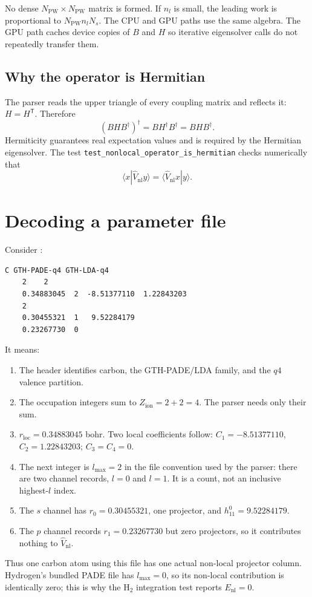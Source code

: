 \documentclass[10pt,twocolumn]{article}
\newcommand{\vnl}{\widehat V_{\mathrm{nl}}}
\newcommand{\zion}{Z_{\mathrm{ion}}}
\newcommand{\code}[1]{\texttt{#1}}
\begin{document}
No dense \(N_{\mathrm{PW}}\times N_{\mathrm{PW}}\) matrix is formed.  If
\(n_l\) is small, the leading work is proportional to
\(N_{\mathrm{PW}}n_lN_s\).  The CPU and GPU paths use the same algebra.  The
GPU path caches device copies of \(B\) and \(H\) so iterative eigensolver
calls do not repeatedly transfer them.

\subsection{Why the operator is Hermitian}

The parser reads the upper triangle of every coupling matrix and reflects it:
\(H=H^\mathsf T\).  Therefore
\begin{equation}
(BHB^\dagger)^\dagger
=BH^\dagger B^\dagger=BHB^\dagger.
\end{equation}
Hermiticity guarantees real expectation values and is required by the
Hermitian eigensolver.  The test
\code{test\_nonlocal\_operator\_is\_hermitian} checks numerically that
\begin{equation}
\langle x|\vnl y\rangle
=\langle\vnl x|y\rangle.
\end{equation}

\section{Decoding a parameter file}

Consider :
\begin{lstlisting}
C GTH-PADE-q4 GTH-LDA-q4
    2    2
    0.34883045  2  -8.51377110  1.22843203
    2
    0.30455321  1   9.52284179
    0.23267730  0
\end{lstlisting}
It means:
\begin{enumerate}
  \item The header identifies carbon, the GTH-PADE/LDA family, and the
  \(q4\) valence partition.
  \item The occupation integers sum to \(\zion=2+2=4\).  The parser needs
  only their sum.
  \item \(r_{\mathrm{loc}}=0.34883045\) bohr.  Two local coefficients follow:
  \(C_1=-8.51377110\), \(C_2=1.22843203\); \(C_3=C_4=0\).
  \item The next integer is \(l_{\max}=2\) in the file convention used by
  the parser: there are two channel records, \(l=0\) and \(l=1\).
  It is a count, not an inclusive highest-\(l\) index.
  \item The \(s\) channel has \(r_0=0.30455321\), one projector, and
  \(h_{11}^{0}=9.52284179\).
  \item The \(p\) channel records \(r_1=0.23267730\) but zero projectors, so
  it contributes nothing to \(\vnl\).
\end{enumerate}
Thus one carbon atom using this file has one actual non-local projector
column.  Hydrogen's bundled PADE file has \(l_{\max}=0\), so its
non-local contribution is identically zero; this is why the H\(_2\)
integration test reports \(E_{\mathrm{nl}}=0\).
\end{document}
